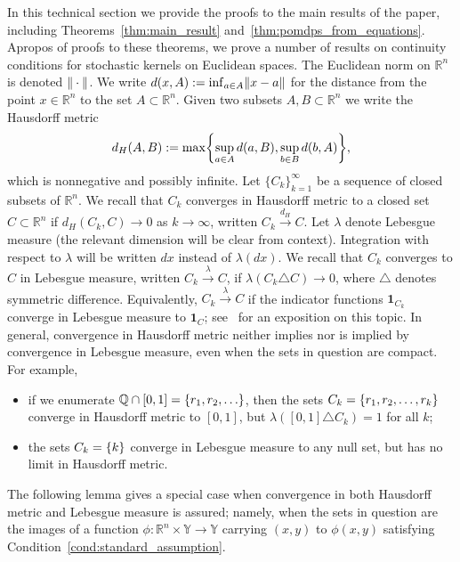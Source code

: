\documentclass[11pt,onecolumn]{IEEEtran}  %
\newcommand{\Qb}{\mathbb{Q}}
\newcommand{\Rb}{\mathbb{R}}
\newcommand{\Yb}{\mathbb{Y}}
\newcommand{\hto}{\xrightarrow{d_H}}
\newcommand{\lto}{\xrightarrow{\lambda}}
\newcommand{\oneAlt}[1]{\mathbf{1}_{#1}}
\newcommand{\defeq}{:=}%
\DeclarePairedDelimiter{\set}{\{}{\}}
\DeclarePairedDelimiter{\norm}{\|}{\|}
\theoremstyle{definition}
\begin{document}
In this technical section we provide the proofs to the main results of the paper, including Theorems~\ref{thm:main_result} and~\ref{thm:pomdps_from_equations}. Apropos of proofs to these theorems, we prove a number of results on continuity conditions for stochastic kernels on Euclidean spaces.   The Euclidean norm on $\Rb^n$ is denoted $\norm{\:\cdot\:}$. We write $d(x,A) \defeq \inf_{a \in A} \norm{x-a}$ for the distance from the point $x \in \Rb^n$ to the set $A \subset \Rb^n$. Given two subsets $A, B \subset \Rb^n$ we write the Hausdorff metric
\begin{equation} \label{eq:hausdorff_metric}
    d_H(A, B) \defeq \max\set*{
        \sup_{a \in A} d(a,B),
        \sup_{b \in B} d(b,A)
    },
\end{equation}
which is nonnegative and possibly infinite. Let $\{C_k\}_{k=1}^{\infty}$ be a sequence of closed subsets of $\Rb^n$. We recall that $C_k$ converges in Hausdorff metric to a closed set $C \subset \Rb^n$ if $d_H(C_k, C) \to 0$ as $k \to \infty$, written $C_k \hto C$. Let $\lambda$ denote Lebesgue measure (the relevant dimension will be clear from context). Integration with respect to $\lambda$ will be written $dx$ instead of $\lambda(dx)$. We recall that $C_k$ converges to $C$ in Lebesgue measure, written $C_k \lto C$, if $\lambda(C_k \triangle C) \to 0$, where $\triangle$ denotes symmetric difference. Equivalently, $C_k \lto C$ if the indicator functions $\oneAlt{C_k}$ converge in Lebesgue measure to $\oneAlt{C}$; see~\citet{beer_hausdorff_1974} for an exposition on this topic. In general, convergence in Hausdorff metric neither implies nor is implied by convergence in Lebesgue measure, even when the sets in question are compact. For example,
\begin{itemize}
    \item if we enumerate $\Qb \cap [0,1] = \set{r_1, r_2, \dots}$, then the sets $C_k = \set{r_1, r_2, \dots, r_k}$ converge in Hausdorff metric to $[0,1]$, but $\lambda([0,1] \triangle C_k) = 1$ for all $k$;
    \item the sets $C_k = \set{k}$ converge in Lebesgue measure to any null set, but has no limit in Hausdorff metric.
\end{itemize}
The following lemma gives a special case when convergence in both Hausdorff metric and Lebesgue measure is assured; namely, when the sets in question are the images of a function $\phi : \Rb^n \times \Yb \to \Yb$ carrying $(x,y)$ to $\phi(x,y)$ satisfying Condition~\ref{cond:standard_assumption}.
\end{document}
